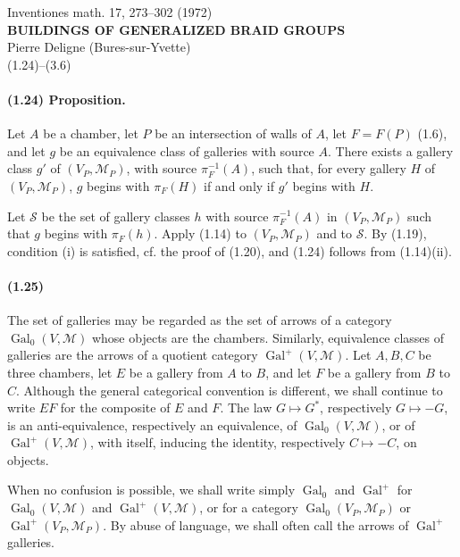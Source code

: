 \documentclass[10pt]{article}
\begin{document}
\begin{center}
{\large Inventiones math. 17, 273--302 (1972)}\\[0.4em]
{\Large\bfseries BUILDINGS OF GENERALIZED BRAID GROUPS}\\[0.4em]
Pierre Deligne (Bures-sur-Yvette)\\[0.5em]
{\normalsize (1.24)--(3.6)}
\end{center}


\paragraph{(1.24) Proposition.} Let \(A\) be a chamber, let \(P\) be an intersection of walls of \(A\), let \(F=F(P)\) (1.6), and let \(g\) be an equivalence class of galleries with source \(A\). There exists a gallery class \(g'\) of \((V_P,\mathcal M_P)\), with source \(\pi_F^{-1}(A)\), such that, for every gallery \(H\) of \((V_P,\mathcal M_P)\), \(g\) begins with \(\pi_F(H)\) if and only if \(g'\) begins with \(H\).

Let \(\mathcal S\) be the set of gallery classes \(h\) with source \(\pi_F^{-1}(A)\) in \((V_P,\mathcal M_P)\) such that \(g\) begins with \(\pi_F(h)\). Apply (1.14) to \((V_P,\mathcal M_P)\) and to \(\mathcal S\). By (1.19), condition (i) is satisfied, cf. the proof of (1.20), and (1.24) follows from (1.14)(ii).

\paragraph{(1.25)} The set of galleries may be regarded as the set of arrows of a category \(\operatorname{Gal}_0(V,\mathcal M)\) whose objects are the chambers. Similarly, equivalence classes of galleries are the arrows of a quotient category \(\operatorname{Gal}^+(V,\mathcal M)\). Let \(A,B,C\) be three chambers, let \(E\) be a gallery from \(A\) to \(B\), and let \(F\) be a gallery from \(B\) to \(C\). Although the general categorical convention is different, we shall continue to write \(EF\) for the composite of \(E\) and \(F\). The law \(G\mapsto G^*\), respectively \(G\mapsto -G\), is an anti-equivalence, respectively an equivalence, of \(\operatorname{Gal}_0(V,\mathcal M)\), or of \(\operatorname{Gal}^+(V,\mathcal M)\), with itself, inducing the identity, respectively \(C\mapsto -C\), on objects.

When no confusion is possible, we shall write simply \(\operatorname{Gal}_0\) and \(\operatorname{Gal}^+\) for \(\operatorname{Gal}_0(V,\mathcal M)\) and \(\operatorname{Gal}^+(V,\mathcal M)\), or for a category \(\operatorname{Gal}_0(V_P,\mathcal M_P)\) or \(\operatorname{Gal}^+(V_P,\mathcal M_P)\). By abuse of language, we shall often call the arrows of \(\operatorname{Gal}^+\) galleries.
\end{document}
